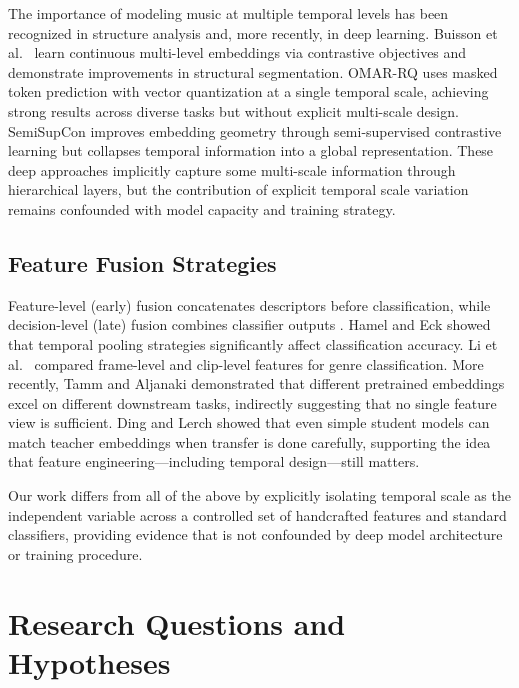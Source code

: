 \documentclass[conference]{IEEEtran}
\begin{document}
The importance of modeling music at multiple temporal levels has been recognized in structure analysis \cite{serra2014unsupervised} and, more recently, in deep learning.
Buisson et al.\ \cite{buisson2024self} learn continuous multi-level embeddings via contrastive objectives and demonstrate improvements in structural segmentation.
OMAR-RQ \cite{alonso2025omar} uses masked token prediction with vector quantization at a single temporal scale, achieving strong results across diverse tasks but without explicit multi-scale design.
SemiSupCon \cite{guinot2024semi} improves embedding geometry through semi-supervised contrastive learning but collapses temporal information into a global representation.
These deep approaches implicitly capture some multi-scale information through hierarchical layers, but the contribution of explicit temporal scale variation remains confounded with model capacity and training strategy.

\subsection{Feature Fusion Strategies}

Feature-level (early) fusion concatenates descriptors before classification, while decision-level (late) fusion combines classifier outputs \cite{hamel2011temporal}.
Hamel and Eck \cite{hamel2011temporal} showed that temporal pooling strategies significantly affect classification accuracy.
Li et al.\ \cite{li2003comparative} compared frame-level and clip-level features for genre classification.
More recently, Tamm and Aljanaki \cite{tamm2024comparative} demonstrated that different pretrained embeddings excel on different downstream tasks, indirectly suggesting that no single feature view is sufficient.
Ding and Lerch \cite{ding2023audio} showed that even simple student models can match teacher embeddings when transfer is done carefully, supporting the idea that feature engineering---including temporal design---still matters.

Our work differs from all of the above by explicitly isolating temporal scale as the independent variable across a controlled set of handcrafted features and standard classifiers, providing evidence that is not confounded by deep model architecture or training procedure.

\section{Research Questions and Hypotheses}
\end{document}
